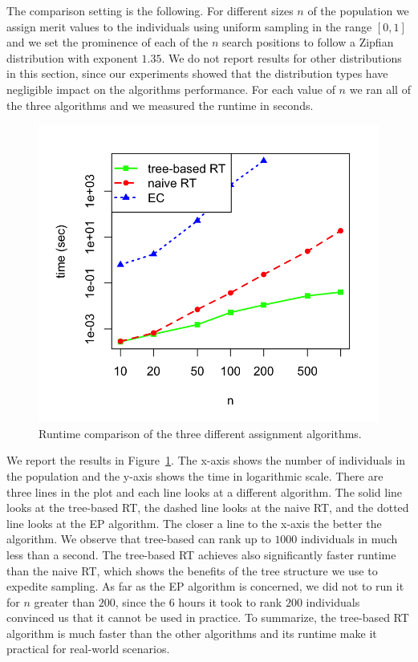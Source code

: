 The comparison setting is the following. For different sizes $n$ of
the population we assign merit values to the individuals using uniform
sampling in the range $[0,1]$ and we set the prominence of each of the
$n$ search positions to follow a Zipfian distribution with exponent
$1.35$. We do not report results for other distributions in this
section, since our experiments showed that the distribution types have
negligible impact on the algorithms performance. For each value of $n$
we ran all of the three algorithms and we measured the runtime in
seconds. 
\begin{figure}[t]
  \centering
  \includegraphics[width=0.6\columnwidth]{../simulations/results/performance.png}
  \caption{Runtime comparison of the three different assignment
    algorithms.}
  \label{fig:runtime}
\end{figure} 
We report the results in Figure~\ref{fig:runtime}. The x-axis shows
the number of individuals in the population and the y-axis shows the
time in logarithmic scale. There are three lines in the plot and each
line looks at a different algorithm. The solid line looks at the
tree-based RT, the dashed line looks at the naive RT, and the dotted
line looks at the EP algorithm. The closer a line to the x-axis the
better the algorithm. We observe that tree-based can rank up to $1000$
individuals in much less than a second. The tree-based RT achieves
also significantly faster runtime than the naive RT, which shows the
benefits of the tree structure we use to expedite sampling. As far as
the EP algorithm is concerned, we did not to run it for $n$ greater
than $200$, since the $6$ hours it took to rank $200$ individuals
convinced us that it cannot be used in practice. To summarize, the
tree-based RT algorithm is much faster than the other algorithms and
its runtime make it practical for real-world scenarios.


